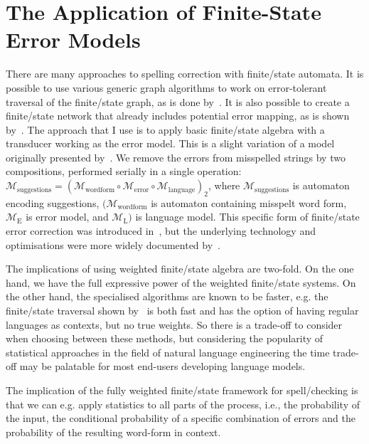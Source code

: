 \documentclass[officiallayout,final]{unihelcompling}
\begin{document}
\section{The Application of Finite-State Error Models}
\label{sec:error-application}

There are many approaches to spelling correction with finite\-/state automata.
It is possible to use various generic graph algorithms to work on
error-tolerant traversal of the finite\-/state graph, as is done
by~\citet{hulden2009fast}.  It is also possible to create a finite\-/state
network that already includes potential error mapping, as is shown
by~\citet{schulz2002fast}. The approach that I use is to apply basic
finite\-/state algebra with a transducer working as the error model. This is a
slight variation of a model originally presented by~\citet{mohri2003edit}. We
remove the errors from misspelled strings by two compositions, performed
serially in a single operation: $\mathcal{M}_{\mathrm{suggestions}} =
(\mathcal{M}_{\mathrm{word form}} \circ \mathcal{M}_{\mathrm{error}} \circ
\mathcal{M}_{\mathrm{language}})_2$, where $\mathcal{M}_{\mathrm{suggestions}}$
is automaton encoding suggestions, $(\mathcal{M}_{\mathrm{word form}}$ is
automaton containing misspelt word form, $\mathcal{M}_{\mathrm{E}}$ is error
model, and $\mathcal{M}_{\mathrm{L}})$ is language model. This specific form of
finite\-/state error correction was introduced
in~, but the underlying technology and
optimisations were more widely documented by~\citet{linden2011hfst}.

The implications of using weighted finite\-/state algebra are two-fold. On the
one hand, we have the full expressive power of the weighted finite\-/state
systems.  On the other hand, the specialised algorithms are known to be faster,
e.g.  the finite\-/state traversal shown by~\citet{hulden2009fast} is both fast
and has the option of having regular languages as contexts, but no true
weights.  So there is a trade-off to consider when choosing between these
methods, but considering the popularity of statistical approaches in the field
of natural language engineering the time trade-off may be palatable for most
end-users developing language models.

The implication of the fully weighted finite\-/state framework for
spell\-/checking is that we can e.g. apply statistics to all parts of the
process, i.e., the probability of the input, the conditional probability of a
specific combination of errors and the probability of the resulting word-form
in context. 
\end{document}

